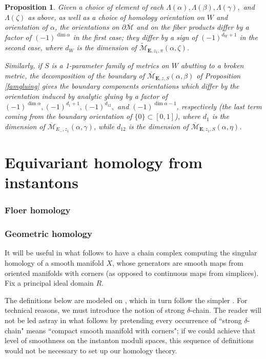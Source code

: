 \documentclass[10pt,a4paper]{amsart}
\newcounter{qchap}
\newcommand{\qchapter}[1]{\refstepcounter{qchap}\setcounter{section}{0}\setcounter{equation}{0}\setcounter{theorem}{0}\renewcommand{\thesection}{\theqchap.\arabic{section}}\renewcommand{\theequation}{\theqchap.\arabic{equation}}\section*{#1}}
\newcommand{\chapter}[1]{\qchapter{#1}}
\newtheorem{proposition}[theorem]{Proposition}
\theoremstyle{definition}
\theoremstyle{remark}
\numberwithin{figure}{qchap}
\begin{document}
\begin{proposition}
Given a choice of element of each $\Lambda(\alpha), \Lambda(\beta), \Lambda(\gamma),$ and $\Lambda(\zeta)$ as above, as well as a choice of homology orientation on $W$ and orientation of $\alpha$, the orientations on $\partial \overline{\mathcal M}$ and on the fiber products differ by a factor of $(-1)^{\dim \alpha}$ in the first case; they differ by a sign of $(-1)^{d_W+1}$ in the second case, where $d_W$ is the dimension of $\widetilde{\mathcal M}_{\mathbf{E},z_1,\pi}(\alpha, \zeta)$.

Similarly, if $S$ is a 1-parameter family of metrics on $W$ abutting to a broken metric, the decomposition of the boundary of $\overline{\mathcal M}_{\mathbf{E},z,S}(\alpha, \beta)$ of Proposition \ref{famgluing} gives the boundary components orientations which differ by the orientation induced by analytic gluing by a factor of $(-1)^{\dim \alpha}, (-1)^{d_1+1}, (-1)^{d_{12}}, $ and $(-1)^{\dim \alpha - 1}$, respectively (the last term coming from the boundary orientation of $\{0\} \subset [0,1]$), where $d_1$ is the dimension of $\overline{\mathcal M}_{E_-, z_1}(\alpha, \gamma)$, while $d_{12}$ is the dimension of $\overline{\mathcal M}_{\mathbf{E},z_1,S}(\alpha, \eta)$. 
\end{proposition}

\part{Equivariant homology from instantons}\label{part2}


\chapter{Floer homology}\label{chap:6}
\section{Geometric homology}\label{sec:Floer-gchain}
It will be useful in what follows to have a chain complex computing the singular homology of a smooth manifold $X$, whose generators are smooth maps from oriented manifolds with corners (as opposed to continuous maps from simplices). Fix a principal ideal domain $R$. 

The definitions below are modeled on \cite[Chapter~4.1]{Lin}, which in turn follow the simpler \cite{Lip}. For technical reasons, we must introduce the notion of strong $\delta$-chain. The reader will not be led astray in what follows by pretending every occurrence of ``strong $\delta$-chain" means ``compact smooth manifold with corners"; if we could achieve that level of smoothness on the instanton moduli spaces, this sequence of definitions would not be necessary to set up our homology theory. 
\end{document}
